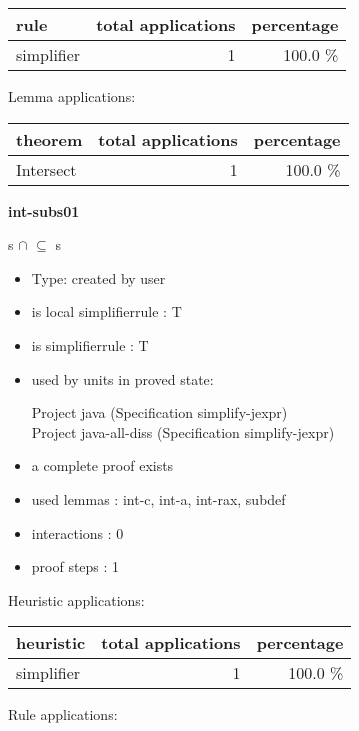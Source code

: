 \documentclass[a4paper]{article}
\begin{document}
\begin{supertabular}{l|r|r}
rule	        & total applications & percentage \\ \hline
simplifier & 1 & 100.0 \% \\

\end{supertabular}

Lemma applications:

\begin{supertabular}{l|r|r}
theorem	        & total applications & percentage \\ \hline
Intersect & 1 & 100.0 \% \\

\end{supertabular}
\pagebreak

{\LARGE\bf int-subs01}\label{lemma-int-subs01}

\medskip

 \Fol s $\cap$  $\subseteq$ s

\begin{itemize}

\item Type: created by user

\item is local simplifierrule : T
\item is simplifierrule : T
\item used by units in proved state:

Project java (Specification simplify-jexpr) \\
Project java-all-diss (Specification simplify-jexpr)
\item       a complete proof exists
\item       used lemmas  : int-c, int-a, int-rax, subdef
\item       interactions : 0
\item       proof steps  : 1
\end{itemize}

\medskip


Heuristic applications:

\begin{supertabular}{l|r|r}
heuristic	& total applications & percentage \\ \hline
simplifier & 1 & 100.0 \% \\

\end{supertabular}

Rule applications:
\end{document}
